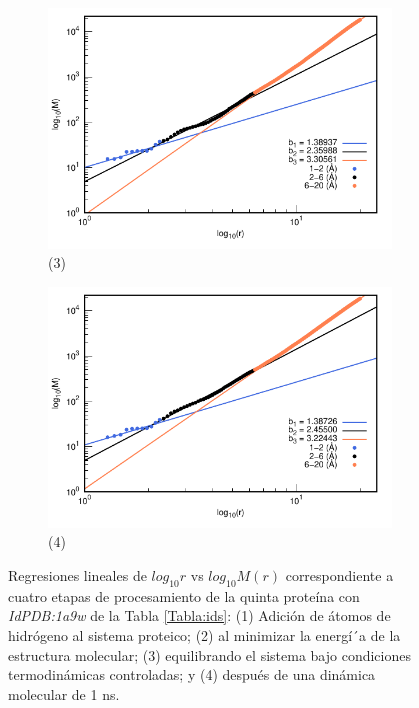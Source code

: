 \begin{figure}[H]
			\vspace{0cm} %
			
			\hspace{-0.3cm} 
			\begin{subfigure}{0.49\textwidth}
				\centering
				\includegraphics[width=\linewidth,page=1]{graphs/PDBs/1a9w/1a9wEq.pdf}
				\caption{(3)}
			\end{subfigure}
			\hspace{0.2cm}
			\begin{subfigure}{0.49\textwidth} %
				\centering
				\includegraphics[width=\linewidth,page=1]{graphs/PDBs/1a9w/1a9w1ns.pdf}
				\caption{(4)}
			\end{subfigure}
			\caption{Regresiones lineales de $log_{10}r$ vs $log_{10}M(r)$ correspondiente a cuatro etapas de procesamiento de la quinta prote\'{i}na con \textit{IdPDB:1a9w} de la Tabla \ref{Tabla:ids}: (1) Adici\'{o}n de \'{a}tomos de hidr\'{o}geno al sistema proteico; (2) al minimizar la energ\'{i´}a de la estructura molecular; (3) equilibrando el sistema bajo condiciones termodin\'{a}micas controladas; y (4) despu\'{e}s de una din\'{a}mica molecular de 1 ns.}
			\label{fig:1a9w}
		\end{figure}
		
